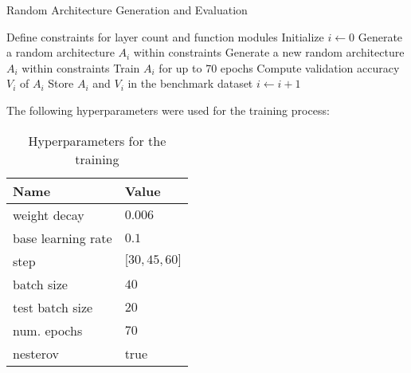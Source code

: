 \begin{comment}
    
\begin{algorithm}
\caption{Random Architecture Generation and Evaluation}
\label{alg:random_arch_gen_eval}
\begin{algorithmic}[1]
\Require{$N$: number of architectures to generate}
\State Define constraints for layer count and function modules
\State Initialize $i \gets 0$
\While{$i < N$}
    \State Generate a random architecture $A_i$ within constraints
    \If{not exists($A_i$)}
        \State Train $A_i$ for up to 70 epochs
        \State Compute validation accuracy $V_i$ of $A_i$
        \State Store $A_i$ and $V_i$ in the benchmark dataset
        \State $i \gets i + 1$
    \EndIf
\EndWhile
\end{algorithmic}
\end{algorithm}
\end{comment}

\begin{algorithm}
\caption{Random Architecture Generation and Evaluation}
\label{alg:random_arch_gen_eval}
\begin{algorithmic}[1]
\State Define constraints for layer count and function modules
\State Initialize $i \gets 0$
    \State Generate a random architecture $A_i$ within constraints
        \State Generate a new random architecture $A_i$ within constraints
    \EndWhile
    \State Train $A_i$ for up to 70 epochs
    \State Compute validation accuracy $V_i$ of $A_i$
    \State Store $A_i$ and $V_i$ in the benchmark dataset
    \State $i \gets i + 1$
\EndWhile
\end{algorithmic}
\end{algorithm}


\clearpage
The following hyperparameters were used for the training process: 

\begin{table}[h]
\centering
\caption{Hyperparameters for the training}
\begin{tabular}{ll}
\textbf{Name}                           & \textbf{Value}   \\ \hline
\multicolumn{1}{l|}{weight decay}       & $0.006$          \\
\multicolumn{1}{l|}{\cellcolor{verylightgray}base learning rate} & \cellcolor{verylightgray}$0.1$              \\
\multicolumn{1}{l|}{step}               & ${[}30, 45, 60{]}$ \\
\multicolumn{1}{l|}{\cellcolor{verylightgray}batch size}         & \cellcolor{verylightgray}$40$               \\
\multicolumn{1}{l|}{test batch size}    & $20$               \\
\multicolumn{1}{l|}{\cellcolor{verylightgray}num. epochs}        & \cellcolor{verylightgray}$70$               \\
\multicolumn{1}{l|}{nesterov}           & true            
\end{tabular}
\end{table}

